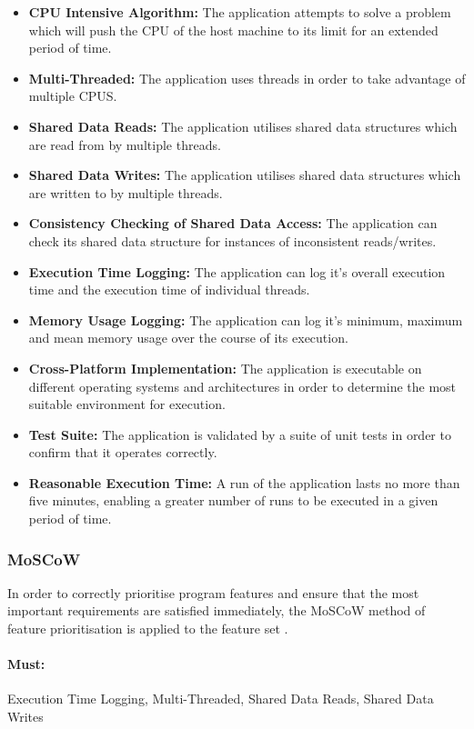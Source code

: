\documentclass[12pt,a4paper]{article}
\begin{document}
\begin{itemize} \itemsep0pt
        \item \textbf{CPU Intensive Algorithm:} The application attempts to solve a problem which will push the CPU of the host machine to its limit for an extended period of time. 
        \item \textbf{Multi-Threaded:} The application uses threads in order to take advantage of multiple CPUS.
        \item \textbf{Shared Data Reads:} The application utilises shared data structures which are read from by multiple threads.
        \item \textbf{Shared Data Writes:} The application utilises shared data structures which are written to by multiple threads.
        \item \textbf{Consistency Checking of Shared Data Access:} The application can check its shared data structure for instances of inconsistent reads/writes.
        \item \textbf{Execution Time Logging:} The application can log it's overall execution time and the execution time of individual threads.
        \item \textbf{Memory Usage Logging:} The application can log it's minimum, maximum and mean memory usage over the course of its execution.
        \item \textbf{Cross-Platform Implementation:} The application is executable on different operating systems and architectures in order to determine the most suitable environment for execution.
        \item \textbf{Test Suite:} The application is validated by a suite of unit tests in order to confirm that it operates correctly.
        \item \textbf{Reasonable Execution Time:} A run of the application lasts no more than five minutes, enabling a greater number of runs to be executed in a given period of time.
\end{itemize}

\subsubsection{MoSCoW}

In order to correctly prioritise program features and ensure that the most important requirements are satisfied immediately, the MoSCoW method of feature prioritisation is applied to the feature set \cite{moscow}.

\paragraph{Must:}
Execution Time Logging,
Multi-Threaded,
Shared Data Reads,
Shared Data Writes
\end{document}
